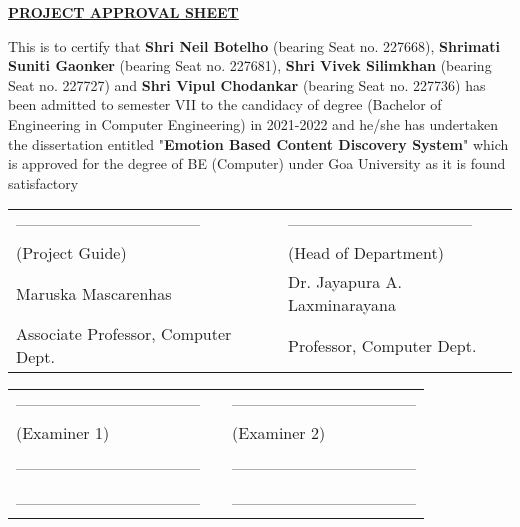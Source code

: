 \begin{center}
\underline{\bfseries \huge PROJECT APPROVAL SHEET}\\
\vspace{1cm}
\end{center}
\noindent This is to certify that \textbf{Shri Neil Botelho} (bearing Seat no. 227668), \textbf{Shrimati Suniti Gaonker} (bearing Seat no. 227681), \textbf{Shri Vivek Silimkhan} (bearing Seat no. 227727) and \textbf{Shri Vipul Chodankar} (bearing Seat no. 227736) has been admitted to semester VII to the candidacy of degree (Bachelor of Engineering in Computer Engineering) in 2021-2022 and he/she has undertaken the dissertation entitled "\textbf{Emotion Based Content Discovery System}" which is approved for the degree of BE (Computer) under Goa University as it is found satisfactory

\vspace{2.8cm}

\begin{table}[H]
	\begin{center}
\begin{tabular}{lcl}
	\noindent ----------------------------------- &\hspace{1cm}&  ----------------------------------- \\
(Project Guide) & \hspace{3cm} & (Head of Department) \\
Maruska Mascarenhas & \hspace{3cm} & Dr. Jayapura A. Laxminarayana  \\
Associate Professor, Computer Dept. & \hspace{3cm} & Professor, Computer Dept. \\
\end{tabular}
\end{center}
\end{table}

\vspace{2.5cm}

\begin{table}[H]
	\begin{center}
\begin{tabular}{lcl}
	\noindent ----------------------------------- &\hspace{5cm}&  ----------------------------------- \\
(Examiner 1) & \hspace{5cm} & (Examiner 2) \\
\\
\noindent ----------------------------------- &\hspace{5cm} &\noindent ----------------------------------- \\
\\
\noindent ----------------------------------- &\hspace{5cm} &\noindent ----------------------------------- \\

\end{tabular}
\end{center}
\end{table}

